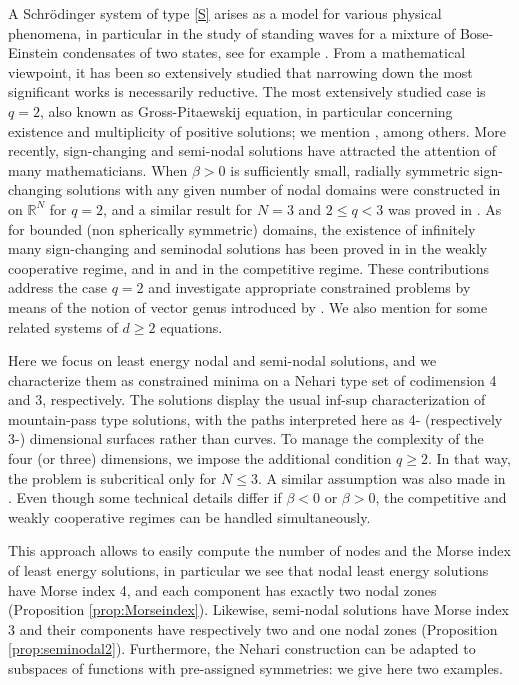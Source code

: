 \documentclass[10pt,a4paper]{amsart}
\numberwithin{equation}{section}
\begin{document}
A Schr\"{o}dinger system of type  \eqref{S}  arises as a model for various physical
phenomena, in particular in the study of standing
waves for a mixture of Bose-Einstein condensates of two states, see
for example \cite{BoseEinstein}.
From a mathematical viewpoint, it has been so extensively studied that narrowing down
the most significant works is necessarily reductive.
The most extensively studied case is $q=2$, also known as Gross-Pitaewskij equation,
in particular concerning existence and multiplicity of positive solutions;
we mention \cite{LW_AIHP05,BW_JDE06,MMP_JDE06}, among others.
More recently, sign-changing and semi-nodal solutions have attracted the attention of
many mathematicians. When $\beta >0$ is sufficiently small,  radially symmetric
sign-changing solutions with any given number of nodal domains  were constructed
in \cite{MMP_CCM08} on $\mathbb{R}^N$ for $q=2$, and  a similar result for $N=3$ and $2\le q <3$
was proved in \cite{Z_BVP24}.
As for bounded (non spherically symmetric) domains,  the existence of infinitely many
sign-changing and seminodal solutions has been proved in \cite{CLZ_JDE13}
in the weakly cooperative regime, and in \cite{CLZ_ASNSP16} and \cite{LLW_CV15}
in the competitive regime.
These contributions address the case
$q=2$ and investigate  appropriate constrained problems by means of the notion of
vector genus introduced by \cite{TT_AIHP12}.
We also mention  \cite{SW_DCDS15,CS_CCM23,Song_JDE25} for some related systems
of $d\ge 2$ equations.

Here we focus on least energy nodal and semi-nodal solutions, and we characterize
them as constrained minima on a Nehari type set of codimension 4 and 3, respectively.
The solutions display the usual inf-sup characterization of mountain-pass type solutions,
with the paths interpreted here as 4- (respectively 3-) dimensional surfaces rather
than curves.
To manage the complexity of the four (or three) dimensions, we impose the additional
condition $q\ge2$. In that way, the problem is subcritical only for $N\le 3$.
A similar assumption was also made in \cite{MMP_JDE06, Z_BVP24}.
Even though some technical details differ if $\beta<0$ or $\beta>0$,
the competitive and weakly cooperative regimes can be handled simultaneously.

This approach allows to easily compute the number of nodes and the Morse index
of least energy solutions, in particular we see that nodal least energy solutions have
Morse index 4, and each component has exactly two nodal zones
(Proposition \ref{prop:Morseindex}). Likewise, semi-nodal solutions have Morse index 3
 and their components have respectively two and one nodal zones
 (Proposition \ref{prop:seminodal2}).
Furthermore, the Nehari construction can be adapted to subspaces of functions with
pre-assigned symmetries: we give here two examples.
\end{document}
